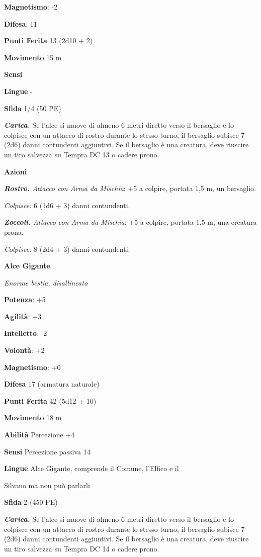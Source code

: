 \begin{multicols}{2}
\textbf{Magnetismo}: -2

\textbf{Difesa}: 11

\textbf{Punti Ferita} 13 (2d10 + 2)

\textbf{Movimento} 15 m

\textbf{Sensi} 

\textbf{Lingue} -

\textbf{Sfida} 1/4 (50 PE)

\emph{\textbf{Carica.}} Se l'alce si muove di almeno 6 metri diretto
verso il bersaglio e lo colpisce con un attacco di rostro durante lo
stesso turno, il bersaglio subisce 7 (2d6) danni contundenti aggiuntivi.
Se il bersaglio è una creatura, deve riuscire un tiro salvezza su Tempra
DC 13 o cadere prono.

\textbf{Azioni}

\emph{\textbf{Rostro.} Attacco con Arma da Mischia}: +5 a colpire,
portata 1,5 m, un bersaglio.

\emph{Colpisce:} 6 (1d6 + 3) danni contundenti.

\emph{\textbf{Zoccoli.} Attacco con Arma da Mischia}: +5 a colpire,
portata 1,5 m, una creatura prona.

\emph{Colpisce:} 8 (2d4 + 3) danni contundenti.

\textbf{Alce Gigante}

\emph{Enorme bestia, disallineato}

\textbf{Potenza}: +5

\textbf{Agilità}: +3

\textbf{Intelletto}: -2

\textbf{Volontà}: +2

\textbf{Magnetismo}: +0

\textbf{Difesa} 17 (armatura naturale)

\textbf{Punti Ferita} 42 (5d12 + 10)

\textbf{Movimento} 18 m

\textbf{Abilità} Percezione +4

\textbf{Sensi} Percezione passiva 14

\textbf{Lingue} Alce Gigante, comprende il Comune, l'Elfico e il

Silvano ma non può parlarli

\textbf{Sfida} 2 (450 PE)

\emph{\textbf{Carica.}} Se l'alce si muove di almeno 6 metri diretto
verso il bersaglio e lo colpisce con un attacco di rostro durante lo
stesso turno, il bersaglio subisce 7 (2d6) danni contundenti aggiuntivi.
Se il bersaglio è una creatura, deve riuscire un tiro salvezza su Tempra
DC 14 o cadere prono.


\end{multicols}
